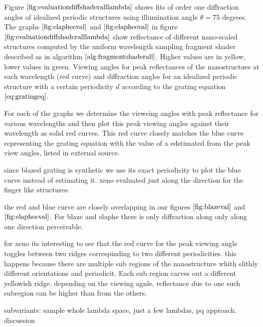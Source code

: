 Figure $\ref{fig:evaluationdiffshaderalllambda}$ shows fits of order one diffraction angles of idealized periodic structures using illumination angle $\theta = 75$ degrees. The graphs $\ref{fig:elapheeval}$ and $\ref{fig:elapheeval}$ in figure $\ref{fig:evaluationdiffshaderalllambda}$ show reflectance of different nano-scaled structures computed by the uniform wavelength sampling fragment shader described as in algorithm $\ref{alg:fragmentshaderall}$. Higher values are in yellow, lower values in green. Viewing angles for peak reflectances of the nanostructues at each wavelength (red curve) and diffraction angles for an idealized periodic structure with a certain periodicity $d$ according to the grating equation $\ref{eq:gratingeq}$.

For each of the graphs we determine the vieweing angles with peak reflectance for various wavelengths and then plot this peak viewing angles against their wavelength as solid red curves. This red curve closely matches the blue curve representing the grating equation with the value of a edstimated from the peak view angles, listed in external source.


since blazed grating is synthetic we use its exact periodicity to plot the blue curve instead of estimating it. xeno evaluated just along the direction for the finger like structures.

the red and blue curve are closely overlapping in our figures $\ref{fig:blazeval}$ and $\ref{fig:elapheeval}$. For blaze and elaphe there is only diffraction along only along one direction perceivable.

for xeno its interesting to see that the red curve for the peak viewing angle toggles between two ridges correspinding to two different periodicities. this happens because there are multiple sub regions of the nanostructure whith slithly different orientations and periodicit. Each sub region carves out a different yellowish ridge. depending on the viewing agnle, reflectance due to one such subregion can be higher than from the others.




subvariants: sample whole lambda space, just a few lambdas, pq approach.
discussion
